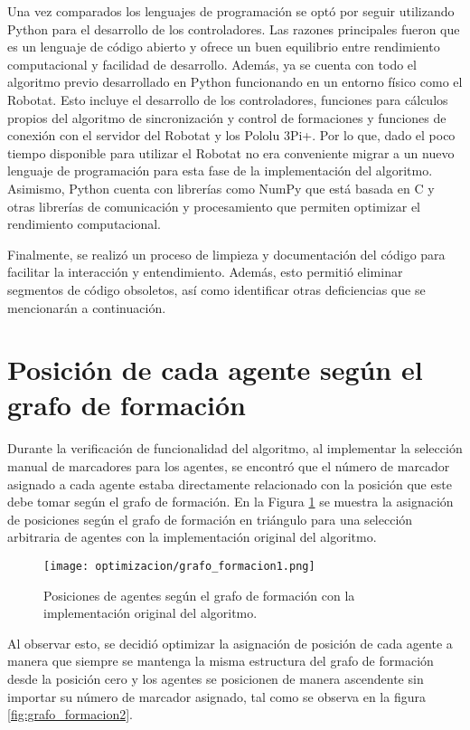Una vez comparados los lenguajes de programación se optó por seguir utilizando Python para el desarrollo de los controladores. Las razones principales fueron que es un lenguaje de código abierto y ofrece un buen equilibrio entre rendimiento computacional y facilidad de desarrollo. Además, ya se cuenta con todo el algoritmo previo desarrollado en Python funcionando en un entorno físico como el Robotat. Esto incluye el desarrollo de los controladores, funciones para cálculos propios del algoritmo de sincronización y control de formaciones y funciones de conexión con el servidor del Robotat y los Pololu 3Pi+. Por lo que, dado el poco tiempo disponible para utilizar el Robotat no era conveniente migrar a un nuevo lenguaje de programación para esta fase de la implementación del algoritmo. Asimismo, Python cuenta con librerías como NumPy que está basada en C y otras librerías de comunicación y procesamiento que permiten optimizar el rendimiento computacional.

Finalmente, se realizó un proceso de limpieza y documentación del código para facilitar la interacción y entendimiento. Además, esto permitió eliminar segmentos de código obsoletos, así como identificar otras deficiencias que se mencionarán a continuación.

\section{Posición de cada agente según el grafo de formación}
Durante la verificación de funcionalidad del algoritmo, al implementar la selección manual de marcadores para los agentes, se encontró que el número de marcador asignado a cada agente estaba directamente relacionado con la posición que este debe tomar según el grafo de formación. En la Figura \ref{fig:grafo_formacion1} se muestra la asignación de posiciones según el grafo de formación en triángulo para una selección arbitraria de agentes con la implementación original del algoritmo.

\begin{figure}[H]
	\centering
	\texttt{[image: optimizacion/grafo\_formacion1.png]}
	\caption{Posiciones de agentes según el grafo de formación con la implementación original del algoritmo.}
	\label{fig:grafo_formacion1}
\end{figure}

Al observar esto, se decidió optimizar la asignación de posición de cada agente a manera que siempre se mantenga la misma estructura del grafo de formación desde la posición cero y los agentes se posicionen de manera ascendente sin importar su número de marcador asignado, tal como se observa en la figura \ref{fig:grafo_formacion2}.

